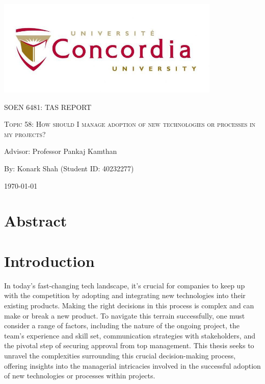 \documentclass{article}
\begin{document}
\begin{titlepage}
    \centering
    \includegraphics[width=0.8\textwidth]{image.jpeg}\par %
     \vspace{2cm}
    {\scshape\Large SOEN 6481: TAS REPORT \par}
    \vspace{1.5cm}
    {\scshape\Huge Topic 58: How should I manage adoption of new technologies or processes in my projects?\par}
    \vspace{1.5cm}
    {\large Advisor: Professor Pankaj Kamthan\par}
    \vspace{1.5cm}
    {\large By: Konark Shah (Student ID: 40232277)\par}
    \vspace{1cm}
    {\large \today\par}
\end{titlepage}

\tableofcontents

\newpage

\section{Abstract}
\lipsum[1]

\section{Introduction}
In today's fast-changing tech landscape, it's crucial for companies to keep up with the competition by adopting and integrating new technologies into their existing products. Making the right decisions in this process is complex and can make or break a new product. To navigate this terrain successfully, one must consider a range of factors, including the nature of the ongoing project, the team's experience and skill set, communication strategies with stakeholders, and the pivotal step of securing approval from top management. This thesis seeks to unravel the complexities surrounding this crucial decision-making process, offering insights into the managerial intricacies involved in the successful adoption of new technologies or processes within projects.
\end{document}
